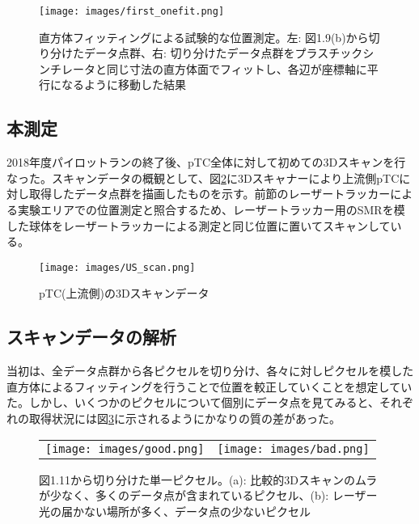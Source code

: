 \documentclass[Yonemoto_master.tex]{subfiles}
\begin{document}
\begin{figure}
    \centering
    \texttt{[image: images/first\_onefit.png]}
    \caption{直方体フィッティングによる試験的な位置測定。左: 図1.9(b)から切り分けたデータ点群、右: 切り分けたデータ点群をプラスチックシンチレータと同じ寸法の直方体面でフィットし、各辺が座標軸に平行になるように移動した結果}
    \label{fig: first_fit}
\end{figure}
  
\subsection{本測定}
 2018年度パイロットランの終了後、pTC全体に対して初めての3Dスキャンを行なった。スキャンデータの概観として、図\ref{fig: US_scan}に3Dスキャナーにより上流側pTCに対し取得したデータ点群を描画したものを示す。前節のレーザートラッカーによる実験エリアでの位置測定と照合するため、レーザートラッカー用のSMRを模した球体をレーザートラッカーによる測定と同じ位置に置いてスキャンしている。

\begin{figure}[h]
\begin{center}
\texttt{[image: images/US\_scan.png]}
\caption{pTC(上流側)の3Dスキャンデータ}
\label{fig: US_scan}
\end{center}
\end{figure}


\subsection{スキャンデータの解析}

  当初は、全データ点群から各ピクセルを切り分け、各々に対しピクセルを模した直方体によるフィッティングを行うことで位置を較正していくことを想定していた。しかし、いくつかのピクセルについて個別にデータ点を見てみると、それぞれの取得状況には図\ref{fig: good_bad}に示されるようにかなりの質の差があった。

\begin{figure}[h]
    \begin{tabular}{cc}
      \begin{minipage}[t]{0.45\hsize}
        \centering
        \texttt{[image: images/good.png]}
        \caption*{(a)}
      \end{minipage} &
      \begin{minipage}[t]{0.45\hsize}
        \centering
        \texttt{[image: images/bad.png]}
         \caption*{(b)}
      \end{minipage}
    \end{tabular}
    \caption{図1.11から切り分けた単一ピクセル。(a): 比較的3Dスキャンのムラが少なく、多くのデータ点が含まれているピクセル、(b): レーザー光の届かない場所が多く、データ点の少ないピクセル}
    \label{fig: good_bad}
  \end{figure}
\end{document}
